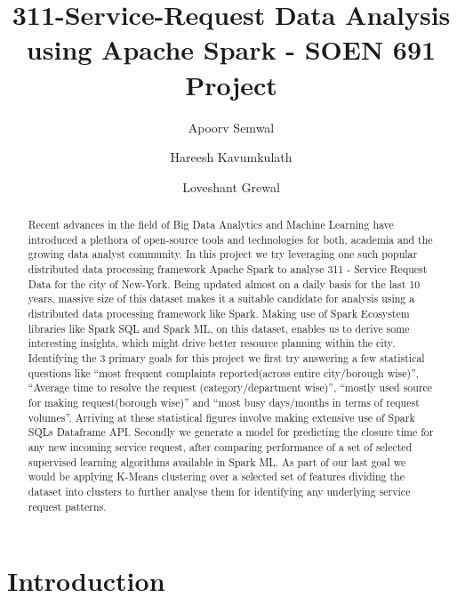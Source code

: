 \documentclass[10pt,twocolumn,letterpaper]{article}
\begin{document}
\title{311-Service-Request Data Analysis using Apache Spark - SOEN 691 Project}
\author{Apoorv Semwal \and Hareesh Kavumkulath \and Loveshant Grewal}
\maketitle

\begin{abstract}
Recent advances in the field of Big Data Analytics and Machine Learning have introduced a plethora of open-source tools and technologies for both, 
academia and the growing data analyst community. In this project we try leveraging one such popular distributed data processing framework Apache Spark
to analyse 311 - Service Request Data for the city of New-York. Being updated almost on a daily basis for the last 10 years, massive size of this dataset makes it a suitable candidate for analysis using a distributed data processing framework like Spark. Making use of Spark Ecosystem libraries like Spark SQL and Spark ML, on this dataset, enables us to derive some interesting insights, which might drive better resource planning within the city. Identifying the 3 primary goals for this project we first try answering a few statistical questions like “most frequent complaints reported(across entire city/borough wise)”, “Average time to resolve the request (category/department wise)”, “mostly used source for making request(borough wise)” and “most busy days/months in terms of request volumes”.
Arriving at these statistical figures involve making extensive use of Spark SQLs Dataframe API. Secondly we generate a model for predicting the closure time for any new incoming service request, after comparing performance of a set of selected supervised learning algorithms available in Spark ML. As part of our last goal we would be applying K-Means clustering over a selected set of features dividing the dataset into clusters to further analyse them for identifying any underlying service request patterns.
\end{abstract}

\section{Introduction}
\end{document}
